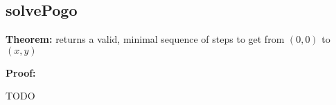 \documentclass[a4paper]{scrartcl}
\newenvironment{myindentpar}[1]%
 {\begin{list}{}%
         {\setlength{\leftmargin}{#1}}%
         \item[]%
 }
 {\end{list}}
\begin{document}
\subsection{solvePogo}
\textbf{Theorem: }  returns a valid, minimal sequence of steps to get from $(0, 0)$ to $(x,y)$

\textbf{Proof: } 
\begin{myindentpar}{1cm}
TODO
\end{myindentpar}
\end{document}
